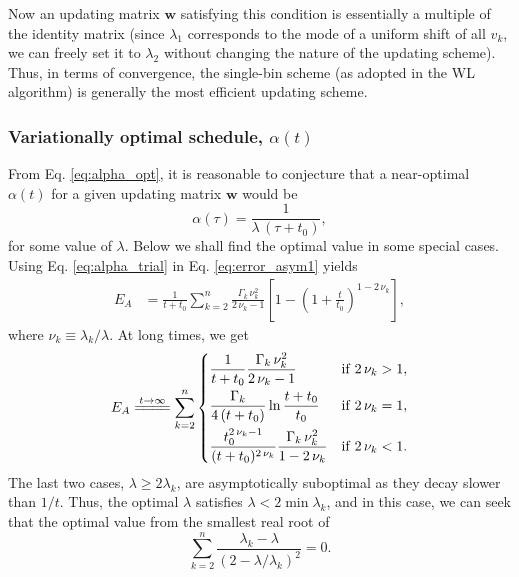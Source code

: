 \documentclass[reprint]{revtex4-1}
\newcommand{\Err}{E}
\begin{document}
Now an updating matrix $\mathbf w$ satisfying this condition
is essentially a multiple of the identity matrix
(since $\lambda_1$ corresponds to the mode
of a uniform shift of all $v_k$,
we can freely set it to $\lambda_2$
without changing the nature of the updating scheme).
%
Thus, in terms of convergence,
the single-bin scheme
(as adopted in the WL algorithm)
is generally the most efficient
updating scheme.




\subsubsection{Variationally optimal schedule, $\alpha(t)$}



From Eq. \eqref{eq:alpha_opt},
it is reasonable to conjecture that
a near-optimal $\alpha(t)$ for
a given updating matrix $\mathbf w$ would be
%
\begin{equation}
\alpha(\tau) = \frac{1}{\lambda \, (\tau + t_0) },
\label{eq:alpha_trial}
\end{equation}
%
for some value of $\lambda$.
%
Below we shall find the optimal value
in some special cases.
%
Using Eq. \eqref{eq:alpha_trial}
in Eq. \eqref{eq:error_asym1} yields
%
\begin{align}
\Err_A
&=
\frac{    1    }
     { t + t_0 }
\sum_{k = 2}^n
  \frac{ \Gamma_k \, \nu_k^2 }
       {    2 \, \nu_k - 1   }
\left[
  1 - \left(
        1 + \frac{ t }{ t_0 }
      \right)^{1 - 2 \, \nu_k}
\right],
\label{eq:error_asym_invt}
\end{align}
%
where $\nu_k \equiv \lambda_k / \lambda$.
%
At long times, we get
$$
\begin{aligned}
  \Err_A
  \stackrel{         t \to \infty         }
           { =\joinrel=\joinrel=\joinrel= }
  \sum_{k = 2}^n
  \begin{dcases}
    \frac{    1    }
         { t + t_0 }
    \frac{ \Gamma_k \, \nu_k^2 }
         {   2 \, \nu_k - 1    }
    &
    \mathrm{if \;} 2 \, \nu_k > 1,
    \\%
    \frac{    \Gamma_k    }
         { 4 \, (t + t_0) }
    \ln \frac{ t + t_0 }
             {   t_0  }
    &
    \mathrm{if \;} 2 \, \nu_k = 1,
    \\
    \frac{  t_0^{ 2 \, \nu_k  - 1}  }
         { (t + t_0)^{ 2 \, \nu_k } }
    \frac{ \Gamma_k \, \nu_k^2 }
         {   1 - 2 \, \nu_k    }
    &
    \mathrm{if \;} 2 \, \nu_k < 1.
  \end{dcases}
\end{aligned}
$$
%
The last two cases, $\lambda \ge 2\lambda_k$,
are asymptotically suboptimal
as they decay slower than $1/t$.
%
Thus, the optimal $\lambda$
satisfies $\lambda < 2 \min \lambda_k$,
and in this case,
we can seek that
the optimal value from
the smallest real root of
%
\begin{equation}
\sum_{k = 2}^n
\frac{ \lambda_k - \lambda }
{ \left(2 - \lambda/ \lambda_k \right)^2 }
= 0.
\label{eq:optimal_lambda_approx}
\end{equation}
\end{document}
